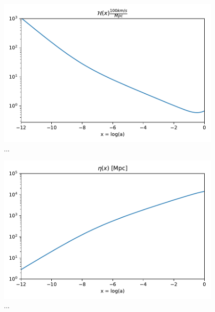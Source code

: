 \documentclass{aa}
\begin{document}
\begin{figure}[h!]
   \includegraphics[scale=0.5]{Figures/M1_Hx.pdf}
   \caption{...}\label{fig:M1_Hx}
\end{figure}

\begin{figure}[h!]
   \includegraphics[scale=0.5]{Figures/M1_eta.pdf}
   \caption{...}\label{fig:M1_eta}
\end{figure}
\end{document}
